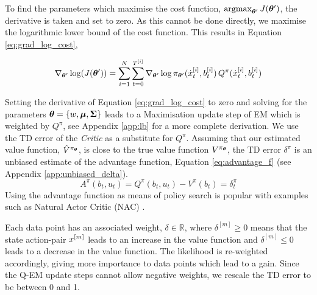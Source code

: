 To find the parameters which maximise the cost function, $\argmax_{\Param'} J(\Param')$, the derivative is taken and 
set to zero. As this cannot be done directly, we maximise the logarithmic lower bound   
of the cost function. This results in Equation \ref{eq:grad_log_cost},

\begin{equation} \label{eq:grad_log_cost}
    \nabla_{\boldsymbol{\theta}'}\log(J(\boldsymbol{\theta}')) = \sum\limits_{i=1}^{N} \sum\limits_{t=0}^{T^{[i]}} \nabla_{\boldsymbol{\theta}'}\log \pi_{\boldsymbol{\theta}'}(\dot{x}^{[i]}_t,b^{[i]}_t) \, Q^{\pi}(\dot{x}^{[i]}_t,b^{[i]}_t)
\end{equation}

Setting the derivative of Equation \ref{eq:grad_log_cost} to zero and solving for the parameters
$\boldsymbol{\theta}=\{w,\boldsymbol{\mu},\boldsymbol{\Sigma}\}$ leads to a Maximisation update step of EM
which is weighted by $Q^{\pi}$, see Appendix \ref{app:lb} for a more complete derivation.
We use the TD error of the \textit{Critic} as a substitute for $Q^{\pi}$. Assuming that our estimated value function, $\hat{V}^{\pi_{\boldsymbol{\theta}}}$, 
is close to the true value function $V^{\pi_{\boldsymbol{\theta}}}$, the TD error $\delta^{\pi}$ is an unbiased estimate of the advantage function, Equation \ref{eq:advantage_f} 
(see Appendix \ref{app:unbiased_delta}).
\begin{equation}\label{eq:advantage_f}
 A^{\pi}(b_t,u_t) = Q^{\pi}(b_t,u_t) - V^{\pi}(b_t) = \delta^{\pi}_t
\end{equation}
Using the advantage function as means of policy search is popular with examples such as
Natural Actor Critic (NAC) \cite{peter_nac_2008}.

Each data point has an associated weight, $\delta \in \mathbb{R}$, where $\delta^{[m]} \geq 0$ means that the 
state action-pair $x^{[m]}$ leads to an increase in the value function and $\delta^{[m]} \leq 0$ leads to 
a decrease in the value function. The likelihood is re-weighted accordingly, giving more importance to data points which lead to a gain. Since 
the Q-EM update steps cannot allow negative weights, we rescale the TD error to be between 0 and 1.

